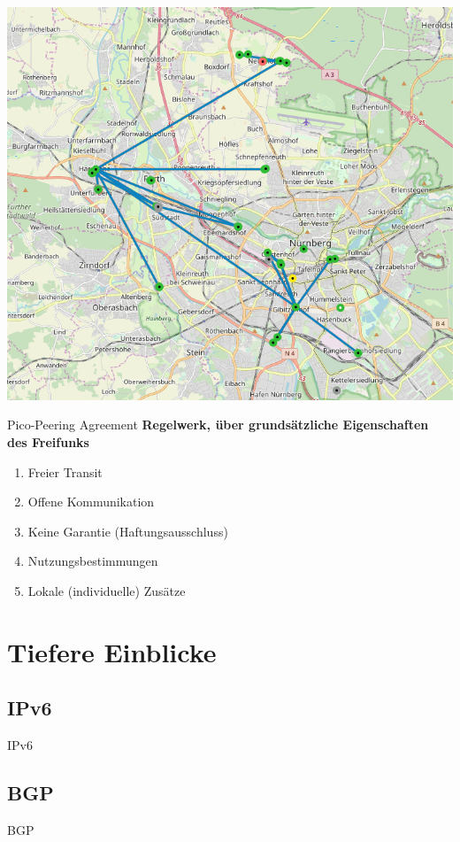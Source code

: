 \documentclass{beamer}
\begin{document}
	\begin{frame}
		\includegraphics[height=\textheight]{media/rf_nbgfue.png}
	\end{frame}

	\begin{frame}{Pico-Peering Agreement}
		\textbf{Regelwerk, über grundsätzliche Eigenschaften des Freifunks}

		\begin{enumerate}
			\item Freier Transit
			\item Offene Kommunikation
			\item Keine Garantie (Haftungsausschluss)
			\item Nutzungsbestimmungen
			\item Lokale (individuelle) Zusätze
		\end{enumerate}
	\end{frame}

	\section{Tiefere Einblicke}
	\subsection{IPv6}
	\begin{frame}{IPv6}
	\end{frame}

	\subsection{BGP}
	\begin{frame}{BGP}
	\end{frame}
\end{document}
